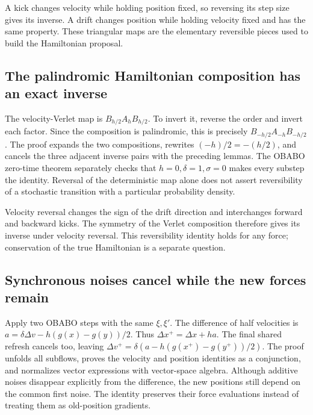 \documentclass[11pt,a4paper]{report}
\begin{document}
A kick changes velocity while holding position fixed, so reversing its step size gives its inverse. A drift changes position while holding velocity fixed and has the same property. These triangular maps are the elementary reversible pieces used to build the Hamiltonian proposal.

\subsection{\texorpdfstring{The palindromic Hamiltonian composition has an exact inverse}{The palindromic Hamiltonian composition has an exact inverse}}
\label{report-step-KineticLangevin-OBABO-lean-3}


The velocity-Verlet map is \(B_{h/2}A_hB_{h/2}\). To invert it, reverse the order and invert each factor. Since the composition is palindromic, this is precisely \(B_{-h/2}A_{-h}B_{-h/2}\). The proof expands the two compositions, rewrites \((-h)/2=-(h/2)\), and cancels the three adjacent inverse pairs with the preceding lemmas. The OBABO zero-time theorem separately checks that \(h=0,\delta=1,\sigma=0\) makes every substep the identity. Reversal of the deterministic map alone does not assert reversibility of a stochastic transition with a particular probability density.



Velocity reversal changes the sign of the drift direction and interchanges forward and backward kicks. The symmetry of the Verlet composition therefore gives its inverse under velocity reversal. This reversibility identity holds for any force; conservation of the true Hamiltonian is a separate question.

\subsection{\texorpdfstring{Synchronous noises cancel while the new forces remain}{Synchronous noises cancel while the new forces remain}}
\label{report-step-KineticLangevin-OBABO-lean-4}


Apply two OBABO steps with the same \(\xi,\xi'\). The difference of half velocities is \(a=\delta\Delta v-h(g(x)-g(y))/2\). Thus \(\Delta x^+=\Delta x+ha\). The final shared refresh cancels too, leaving \(\Delta v^+=\delta(a-h(g(x^+)-g(y^+))/2)\). The proof unfolds all subflows, proves the velocity and position identities as a conjunction, and normalizes vector expressions with vector-space algebra. Although additive noises disappear explicitly from the difference, the new positions still depend on the common first noise. The identity preserves their force evaluations instead of treating them as old-position gradients.
\end{document}
